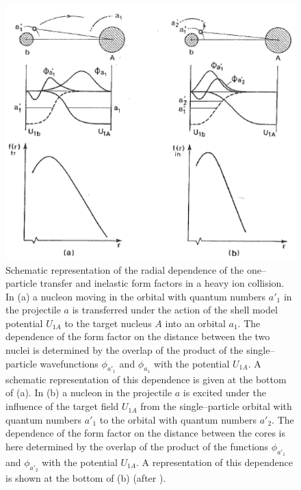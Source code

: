 \begin{figure}
\centerline{\includegraphics*[width=\textwidth,angle=0.3]{nutshell/figs/fig2B3.pdf}}
\caption{Schematic representation of the radial dependence of the one--particle transfer and inelastic form factors in a heavy ion collision. In (a) a nucleon moving in the orbital with quantum numbers $a'_1$ in the projectile $a$ is transferred under the action of the shell model potential $U_{1A}$ to the target nucleus $A$ into an orbital $a_1$. The dependence of the form factor on the distance between the two nuclei is determined by the overlap of the product of the single--particle wavefunctions $\phi_{a'_1}$ and $\phi_{a_1}$ with the potential $U_{1A}$. A schematic representation of this dependence is given at the bottom of (a). In (b) a nucleon in the projectile $a$ is excited under the influence of the target field $U_{1A}$ from the single--particle orbital with quantum numbers $a'_1$ to the orbital with quantum numbers $a'_2$. The dependence of the form factor on the distance between the cores is here determined by the overlap of the product of the functions $\phi_{a'_1}$ and $\phi_{a'_2}$ with the potential $U_{1A}$. A representation of  this dependence is shown at the bottom of (b) (after \cite{Broglia:04a}).}\label{fig_4}
\end{figure}

